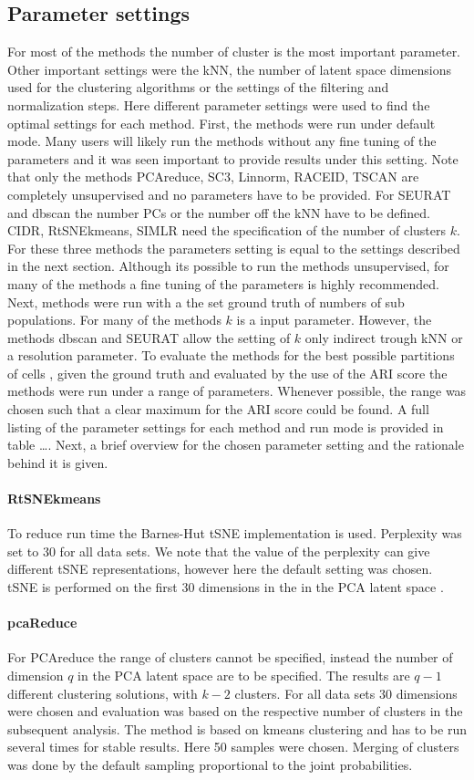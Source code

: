 \documentclass[11pt, a4paper]{article}\usepackage[]{graphicx}\usepackage[]{color}
\begin{document}
\subsection{Parameter settings}
For most of the methods the number of cluster is the most important parameter. Other important settings were the kNN, the number of latent space dimensions used for the clustering algorithms or the settings of the filtering and normalization steps.
Here different parameter settings were used to find the optimal settings for each method. First, the methods were run under default mode. Many users will likely run the methods without any fine tuning of the parameters and it was seen important to provide results under this setting. Note that only the methods PCAreduce, SC3, Linnorm, RACEID, TSCAN are completely unsupervised and no parameters have to be provided. For SEURAT and dbscan the number PCs or the number off the kNN have to be defined. CIDR,  RtSNEkmeans, SIMLR need the specification of the number of clusters $k$. For these three methods the parameters setting is equal to the settings described in the next section.
Although its possible to run the methods unsupervised, for many of the methods a fine tuning of the parameters is highly recommended.
Next, methods were run with a the set ground truth of numbers of sub populations. For many of the methods $k$ is a input parameter. However, the methods dbscan and SEURAT allow the setting of $k$ only indirect trough kNN or a resolution parameter. 
To evaluate the methods for the best possible partitions of cells , given the ground truth and evaluated by the use of the ARI score the methods were run under a range of parameters. Whenever possible, the range was chosen such that a clear maximum for the ARI score could be found. A full listing of the parameter settings for each method and run mode is provided in table \ldots .
Next, a brief overview for the chosen parameter setting and the rationale behind it is given.
\paragraph{RtSNEkmeans}
To reduce run time the Barnes-Hut tSNE implementation is used. Perplexity was set to 30 for all data sets. We note that the value of the perplexity can give different tSNE representations, however here the default setting was chosen. tSNE is performed on the first 30 dimensions in the in the PCA latent space .

\paragraph{pcaReduce}
For PCAreduce the range of clusters cannot be specified, instead the number of dimension $q$ in the PCA latent space are to be specified. The results are $q-1$ different clustering solutions, with $k-2$ clusters. For all data sets 30 dimensions were chosen and evaluation was based on the respective number of clusters in the subsequent analysis. The method is based on kmeans clustering and has to be run several times for stable results. Here 50 samples were chosen. Merging of clusters was done by the default sampling proportional to the joint probabilities. 
\end{document}

